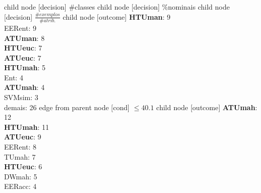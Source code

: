 child {node [decision] {\#classes}
child {node [decision] {\%nominais}
child {node [decision] {$\frac{\#exemplos}{\#atrib.}$}
child {node [outcome] {
\textbf{HTUman}: 9\\
EERent: 9\\
\textbf{ATUman}: 8\\
\textbf{HTUeuc}: 7\\
\textbf{ATUeuc}: 7\\
\textbf{HTUmah}: 5\\
Ent: 4\\
\textbf{ATUmah}: 4\\
SVMsim: 3\\
demais: 26} edge from parent node [cond] {$\leq40.1$}}
child {node [outcome] {
\textbf{ATUmah}: 12\\
\textbf{HTUmah}: 11\\
\textbf{ATUeuc}: 9\\
EERent: 8\\
TUmah: 7\\
\textbf{HTUeuc}: 6\\
DWmah: 5\\
EERacc: 4\\
}}}}}
